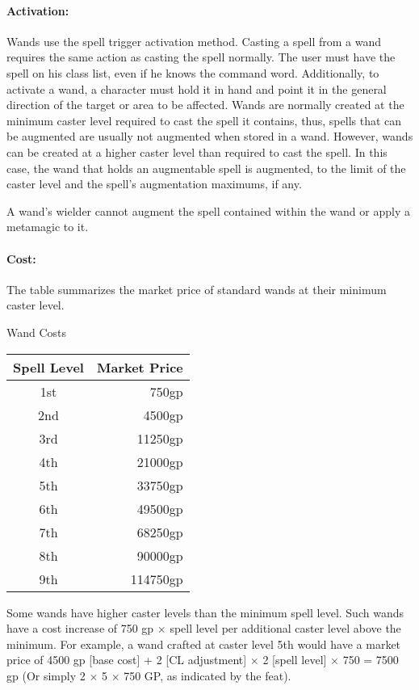 \paragraph{Activation:} Wands use the spell trigger activation method. Casting a spell from a wand requires the same action as casting the spell normally. 
The user must have the spell on his class list, even if he knows the command word. 
Additionally, to activate a wand, a character must hold it in hand and point it in the general direction of the target or area to be affected.
Wands are normally created at the minimum caster level required to cast the spell it contains, thus, spells that can be augmented are usually not augmented when stored in a wand. 
However, wands can be created at a higher caster level than required to cast the spell. 
In this case, the wand that holds an augmentable spell is augmented, to the limit of the caster level and the spell's augmentation maximums, if any. 

A wand's wielder cannot augment the spell contained within the wand or apply a metamagic to it.

\paragraph{Cost:} The  table summarizes the market price of standard wands at their minimum caster level.

\begin{tableonecolumn}
\caption{Wand Costs}
\label{tab:WandCosts}
\begin{tabular}{cr}
\toprule
\textbf{Spell Level}&\textbf{Market Price}\\
\midrule
1st&750gp\\
2nd&4500gp\\
3rd&11250gp\\
4th&21000gp\\
5th&33750gp\\
6th&49500gp\\
7th&68250gp\\
8th&90000gp\\
9th&114750gp\\
\bottomrule
\end{tabular}
\end{tableonecolumn}

Some wands have higher caster levels than the minimum spell level. Such wands have a cost increase of 750 gp $\times$ spell level per additional caster level above the minimum. For example, a  wand crafted at caster level 5th would have a market price of 4500 gp [base cost] + 2 [CL adjustment] $\times$ 2 [spell level] $\times$ 750 = 7500 gp (Or simply 2 $\times$ 5 $\times$ 750 GP, as indicated by the  feat).

